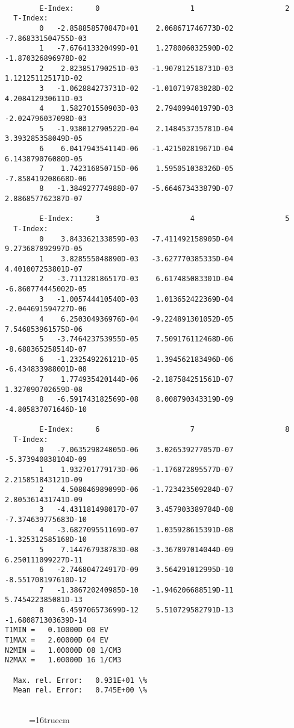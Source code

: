 \documentclass[12pt,dvipdfmx]{article}
\begin{document}
\begin{small}\begin{verbatim}

        E-Index:     0                     1                     2
  T-Index:
        0   -2.858858570847D+01    2.068671746773D-02   -7.868331504755D-03
        1   -7.676413320499D-01    1.278006032590D-02   -1.870326896978D-02
        2    2.823851790251D-03   -1.907812518731D-03    1.121251125171D-02
        3   -1.062884273731D-02   -1.010719783828D-02    4.208412930611D-03
        4    1.582701550903D-03    2.794099401979D-03   -2.024796037098D-03
        5   -1.938012790522D-04    2.148453735781D-04    3.393285358049D-05
        6    6.041794354114D-06   -1.421502819671D-04    6.143879076080D-05
        7    1.742316850715D-06    1.595051038326D-05   -7.858419208668D-06
        8   -1.384927774988D-07   -5.664673433879D-07    2.886857762387D-07

        E-Index:     3                     4                     5
  T-Index:
        0    3.843362133859D-03   -7.411492158905D-04    9.273687892997D-05
        1    3.828555048890D-03   -3.627770385335D-04    4.401007253801D-07
        2   -3.711328186517D-03    6.617485083301D-04   -6.860774445002D-05
        3   -1.005744410540D-03    1.013652422369D-04   -2.044691594727D-06
        4    6.250304936976D-04   -9.224891301052D-05    7.546853961575D-06
        5   -3.746423753955D-05    7.509176112468D-06   -8.688365258514D-07
        6   -1.232549226121D-05    1.394562183496D-06   -6.434833988001D-08
        7    1.774935420144D-06   -2.187584251561D-07    1.327090702659D-08
        8   -6.591743182569D-08    8.008790343319D-09   -4.805837071646D-10

        E-Index:     6                     7                     8
  T-Index:
        0   -7.063529824805D-06    3.026539277057D-07   -5.373940838104D-09
        1    1.932701779173D-06   -1.176872895577D-07    2.215851843121D-09
        2    4.508046989099D-06   -1.723423509284D-07    2.805361431741D-09
        3   -4.431181498017D-07    3.457903389784D-08   -7.374639775683D-10
        4   -3.682709551169D-07    1.035928615391D-08   -1.325312585168D-10
        5    7.144767938783D-08   -3.367897014044D-09    6.250111099227D-11
        6   -2.746804724917D-09    3.564291012995D-10   -8.551708197610D-12
        7   -1.386720240985D-10   -1.946206688519D-11    5.745422385081D-13
        8    6.459706573699D-12    5.510729582791D-13   -1.680871303639D-14
T1MIN =   0.10000D 00 EV
T1MAX =   2.00000D 04 EV
N2MIN =   1.00000D 08 1/CM3
N2MAX =   1.00000D 16 1/CM3

  Max. rel. Error:   0.931E+01 \%
  Mean rel. Error:   0.745E+00 \%


\end{verbatim}\end{small}
\begin{figure} \label{2.1.8FU}
\epsfxsize=16truecm
\end{figure}
\newpage
\end{document}
